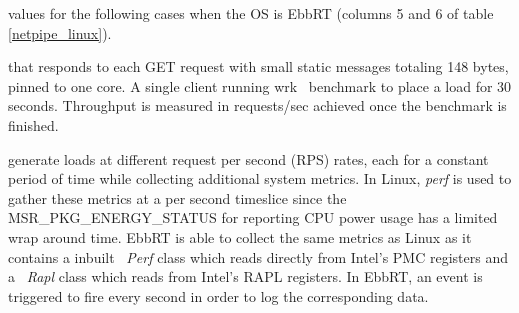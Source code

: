 values for the following cases when the OS is EbbRT  (columns 5 and 6 of table
\ref{netpipe_linux}).


that responds to each GET request with small static messages totaling 148
bytes, pinned to one core. A single client running wrk~\cite{wrk} benchmark to
place a load for 30 seconds. Throughput is measured in requests/sec achieved
once the benchmark is finished.

generate loads at different request per second (RPS) rates, each for a constant
period of time while collecting additional system metrics. In Linux,
\textit{perf} is used to gather these metrics at a per second timeslice since
the MSR\_PKG\_ENERGY\_STATUS for reporting CPU power usage has a limited wrap
around time. EbbRT is able to collect the same metrics as Linux as it contains
a inbuilt ~\textit{Perf} class which reads directly from Intel's PMC registers
and a ~\textit{Rapl} class which reads from Intel's RAPL registers. In EbbRT,
an event is triggered to fire every second in order to log the corresponding
data.
